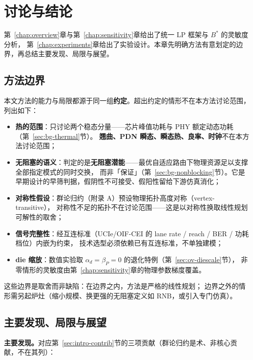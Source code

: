 \chapter{讨论与结论}\label{chap:conclusion}

第~\ref{chap:overview}章与第~\ref{chap:sensitivity}章给出了统一 LP 框架与 $B^*$ 的灵敏度分析，
第~\ref{chap:experiments}章给出了实验设计。本章先明确方法有意划定的边界，再总结主要发现、局限与展望。

\section{方法边界}\label{sec:conc-boundary}

本文方法的能力与局限都源于同一组\textbf{约定}。超出约定的情形不在本方法讨论范围，列出如下：

\begin{itemize}
    \item \textbf{热的范围}：只讨论两个稳态分量——芯片峰值功耗与 PHY 额定动态功耗（第~\ref{sec:bg-thermal}节）。
    \textbf{翘曲、PDN 瞬态、瞬态热、良率、时钟}不在本方法讨论范围；
    \item \textbf{无阻塞的语义}：判定的是\textbf{无阻塞潜能}——最优自适应路由下物理资源足以支撑全部指定模式的同时交换，
    而非「保证」（第~\ref{sec:bg-nonblocking}节）。它是早期设计的早筛判据，假阴性不可接受、假阳性留给下游仿真消化；
    \item \textbf{对称性假设}：群论归约（附录 A）预设物理拓扑高度对称（vertex-transitive），
    对称性不足的拓扑不在讨论范围——这是以对称性换取线性规划可解性的取舍；
    \item \textbf{信号完整性}：经互连标准（UCIe/OIF-CEI 的 lane rate / reach / BER / 功耗档位）内嵌为约束，
    技术选型必须依赖已有互连标准，不单独建模；
    \item \textbf{die 缩放}：数值实验取 $\alpha_d=\beta_P=0$ 的退化特例（第~\ref{sec:ov-diescale}节），
    非零情形的灵敏度由第~\ref{chap:sensitivity}章的物理参数梯度覆盖。
\end{itemize}

这些边界是取舍而非缺陷：在边界之内，方法是严格的线性规划；
边界之外的情形需另起炉灶（缩小规模、换更强的无阻塞定义如 RNB，或引入专门仿真）。

\section{主要发现、局限与展望}\label{sec:conc-findings}

\textbf{主要发现。}对应第~\ref{sec:intro-contrib}节的三项贡献（群论归约是术、非核心贡献，不在其列）：

